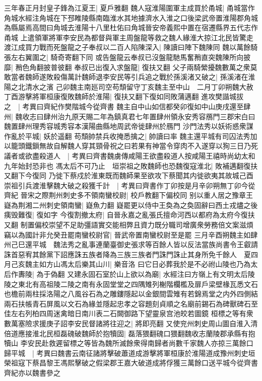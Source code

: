 三年春正月封皇子鋒為江夏王|{
	夏戶雅翻}
魏人寇淮陽圍軍主成買於甬城|{
	甬城當作角城水經注角城在下邳睢陵縣南臨淮水其地據濟水入淮之口後梁武帝置淮陽郡角城為縣屬焉高間曰角城去淮陽十八里杜佑曰角城晉安帝義熙中置在宿遷縣界五代志作甬城}
上遣領軍將軍李安民為都督與軍主周盤龍等救之魏人緣淮大掠江北民皆驚走渡江成買力戰而死盤龍之子奉叔以二百人陷陳深入|{
	陳讀曰陣下魏陳同}
魏以萬餘騎張左右翼圍之|{
	騎奇寄翻下同}
或告盤龍云奉叔已沒盤龍馳馬奮矟直突魏陳所向披靡|{
	矟色角翻披普彼翻}
奉叔已出復入求盤龍|{
	復扶又翻}
父子兩騎縈擾魏數萬之衆莫敢當者魏師遂敗殺傷萬計魏師退李安民等引兵追之戰於孫溪渚又破之|{
	孫溪渚在淮陽之北清水之濱}
己卯魏主南廵司空苟頹留守丁亥魏主至中山　二月丁卯朔魏大赦　丁酉游擊將軍桓康復敗魏師於淮陽|{
	復扶又翻下復如同敗蒲邁翻}
進攻樊諧城拔之　|{
	考異曰齊紀作樊階城今從齊書}
魏主自中山如信都癸卯復如中山庚戌還至肆州|{
	魏收志曰肆州治九原天賜二年為鎮真君七年置肆州領永安秀容鴈門三郡宋白曰魏置肆州理秀容城秀容本漢陽曲縣地周武帝徙肆州於鴈門}
沙門法秀以妖術惑衆謀作亂於平城|{
	妖於遥翻}
苟頹帥禁兵收掩悉擒之|{
	帥讀曰率}
魏主還平城有司囚法秀加以籠頭鐵鎻無故自解魏人穿其頸骨祝之曰若果有神當令穿肉不入遂穿以狥三日乃死議者或欲盡殺道人　|{
	考異曰齊書魏虜傳咸陽王欲盡殺道人按咸陽王禧時尚幼太和九年始封恐非也}
馮太后不可乃止　垣崇祖之敗魏師也恐魏復寇淮北|{
	敗補邁翻復扶又翻下今復同}
乃徙下蔡戍於淮東既而魏師果至欲攻下蔡聞其内徙欲夷其故城己酉崇祖引兵渡淮擊魏大破之殺獲千計　|{
	考異曰齊書作丁卯按是月辛卯朔無丁卯今從齊紀}
晉宋之際荆州刺史多不領南蠻校尉|{
	校戶教翻下偏校同}
别以重人居之豫章王嶷為荆湘二州刺史領南蠻|{
	嶷魚力翻}
嶷罷更以侍中王奐為之奐固辭曰西土戎燼之後痍毁難復|{
	復如字}
今復割撤太府|{
	自晉永嘉之亂張氏擅命河西以都府為太府今復扶又翻}
制置偏校崇望不足助彊語實交能相弊且資力既分職司增廣衆勞務倍文案滋煩竊以為國計非允癸丑罷南蠻校尉官|{
	晉武帝置南蠻校尉至是罷}
三月辛酉朔魏主如肆州己巳還平城　魏法秀之亂事連蘭臺御史張求等百餘人皆以反法當族尚書令王叡請誅首惡宥其餘黨下詔應誅五族者降為三族三族者門誅門誅止其身所免千餘人　夏四月己亥魏主如方山馮太后樂其山川|{
	樂音洛}
曰它日必葬我於是不必祔山陵也乃為太后作夀陵|{
	為于偽翻}
又建永固石室於山上欲以為廟|{
	水經注曰方嶺上有文明太后陵陵之東北有高祖陵二陵之南有永固堂堂之四隅雉列榭階欄檻及扉戶梁壁椽瓦悉文石也檐前兩柱採洛陽之八風谷石為之雕鏤隱起以金銀間雲雉有若錦焉堂之内外四側結兩石扶帳青石屏風以文石為緣並隱起忠孝之容題刻貞順之名廟前錫石為碑獸碑石至佳左右列柏四周迷禽暗日南川表二石闕御路下望靈泉宫池皎若圖鏡}
桓標之等有衆數萬塞險求援庚子詔李安民督諸將往迎之|{
	將即亮翻}
又使兖州刺史周山圖自淮入清倍道應接淮北民桓磊磈破魏師於抱犢固|{
	磊落猥翻磈口猥翻魏收志蘭陵郡承縣有抱犢山}
李安民赴救遲留標之等皆為魏所滅餘衆得南歸者尚數千家魏人亦掠三萬餘口歸平城　|{
	考異曰魏書云南征諸將擊破蕭道成游擊將軍桓康於淮陽道成豫州刺史垣榮祖寇下蔡昌黎王馮熙擊破之假梁郡王嘉大破道成將俘獲三萬餘口送平城今從齊書齊紀亦以魏書參之}
